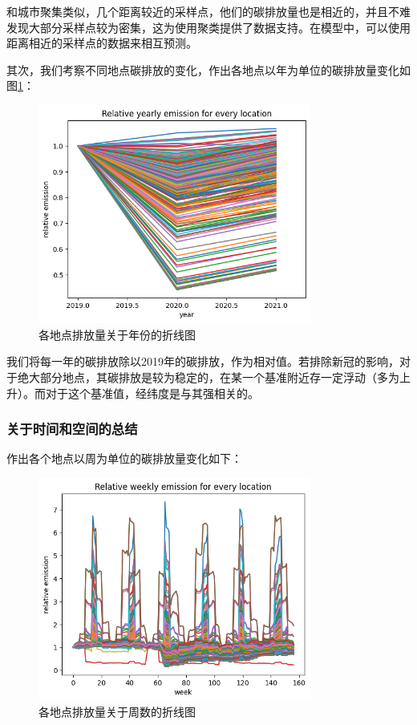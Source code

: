 \documentclass{ctexart}
\begin{document}
和城市聚集类似，几个距离较近的采样点，他们的碳排放量也是相近的，并且不难发现大部分采样点较为密集，这为使用聚类提供了数据支持。在模型中，可以使用距离相近的采样点的数据来相互预测。

其次，我们考察不同地点碳排放的变化，作出各地点以年为单位的碳排放量变化如图\ref{fig:5}：

\begin{figure}[H]
      \centering
      \includegraphics[width=0.8\textwidth]{output5.png}
      \caption{\label{fig:5}各地点排放量关于年份的折线图}
\end{figure}

我们将每一年的碳排放除以2019年的碳排放，作为相对值。若排除新冠的影响，对于绝大部分地点，其碳排放是较为稳定的，在某一个基准附近存一定浮动（多为上升）。而对于这个基准值，经纬度是与其强相关的。

\subsubsection{关于时间和空间的总结}

作出各个地点以周为单位的碳排放量变化如下：

\begin{figure}[H]
      \centering
      \includegraphics[width=0.8\textwidth]{output6.png}
      \caption{各地点排放量关于周数的折线图}
\end{figure}
\end{document}
